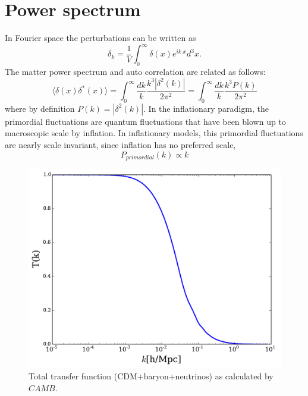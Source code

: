 \section{Power spectrum}
\label{density_ps}
In Fourier space the perturbations can be written as 
\begin{equation}
\delta_{k} = \frac{1}{V} \int^{\infty}_{0} \delta(x) e^{ik.x} d^{3}x .
\end{equation}
The matter power spectrum and auto correlation are related as follows:
\begin{equation}
\langle \delta(x) \delta^{*}(x) \rangle = \int^{\infty}_{0} \frac{dk}{k} \frac{k^{3} |\delta^{2}(k)|}{2\pi^{2}} = \int^{\infty}_{0} \frac{dk}{k}\frac{k^{3} P(k)}{2\pi^{2}}
\end{equation}
where by definition $P(k) = |\delta^{2}(k)|$.
In the inflationary paradigm, the primordial fluctuations are quantum fluctuations that have been blown up to macroscopic scale by inflation. 
In inflationary models, this primordial fluctuations are nearly scale invariant, since inflation has no preferred scale,
\begin{equation}
P_{primordial}(k) \propto k
\end{equation}

\begin{figure}[H]
\includegraphics[width = \columnwidth]{figs/tf.pdf}
\caption{Total transfer function (CDM+baryon+neutrinos) as calculated by $CAMB$.}
\label{tf}
\end{figure}

